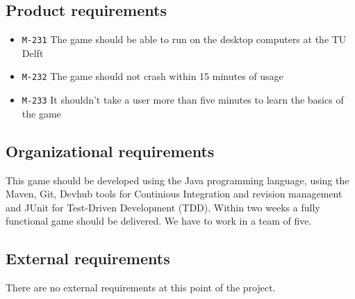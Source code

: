 \documentclass[a4paper]{article}
\begin{document}
\subsection{Product requirements}

\begin{itemize}
  \item \texttt{M-231} The game should be able to run on the desktop computers at the TU Delft
  \item \texttt{M-232} The game should not crash within 15 minutes of usage
  \item \texttt{M-233} It shouldn't take a user more than five minutes to learn the basics of the game
\end{itemize}

\subsection{Organizational requirements}
This game should be developed using the Java programming language, using the Maven, Git, Devhub tools for Continious Integration and revision management and JUnit for Test-Driven Development (TDD). Within two weeks a fully functional game should be delivered. We have to work in a team of five.

\subsection{External requirements}
There are no external requirements at this point of the project.





\pagebreak
\end{document}
